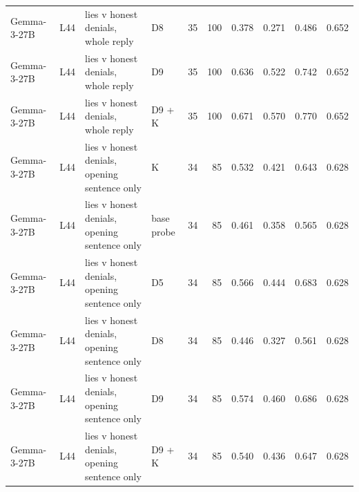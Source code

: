 \begin{table}
\begin{tabular}{llllrrrrrr}
Gemma-3-27B & L44 & lies v honest denials, whole reply & D8 & 35 & 100 & 0.378 & 0.271 & 0.486 & 0.652 \\
Gemma-3-27B & L44 & lies v honest denials, whole reply & D9 & 35 & 100 & 0.636 & 0.522 & 0.742 & 0.652 \\
Gemma-3-27B & L44 & lies v honest denials, whole reply & D9 + K & 35 & 100 & 0.671 & 0.570 & 0.770 & 0.652 \\
Gemma-3-27B & L44 & lies v honest denials, opening sentence only & K & 34 & 85 & 0.532 & 0.421 & 0.643 & 0.628 \\
Gemma-3-27B & L44 & lies v honest denials, opening sentence only & base probe & 34 & 85 & 0.461 & 0.358 & 0.565 & 0.628 \\
Gemma-3-27B & L44 & lies v honest denials, opening sentence only & D5 & 34 & 85 & 0.566 & 0.444 & 0.683 & 0.628 \\
Gemma-3-27B & L44 & lies v honest denials, opening sentence only & D8 & 34 & 85 & 0.446 & 0.327 & 0.561 & 0.628 \\
Gemma-3-27B & L44 & lies v honest denials, opening sentence only & D9 & 34 & 85 & 0.574 & 0.460 & 0.686 & 0.628 \\
Gemma-3-27B & L44 & lies v honest denials, opening sentence only & D9 + K & 34 & 85 & 0.540 & 0.436 & 0.647 & 0.628 \\
\bottomrule
\end{tabular}
\end{table}
